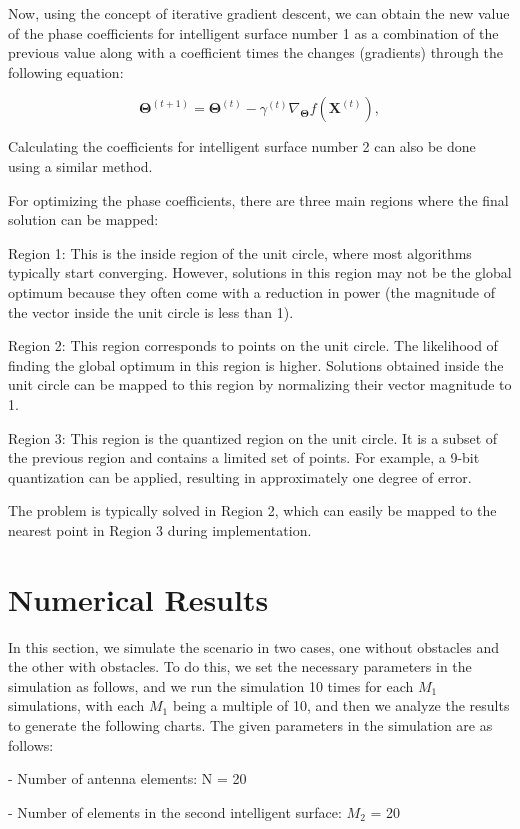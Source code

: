 \documentclass{article}
\begin{document}
Now, using the concept of iterative gradient descent, we can obtain the new value of the phase coefficients for intelligent surface number 1 as a combination of the previous value along with a coefficient times the changes (gradients) through the following equation:

\[
\boldsymbol{\Theta}^{(t+1)}=\boldsymbol{\Theta}^{(t)}-\gamma^{(t)} \nabla_{\boldsymbol{\Theta}} f\left(\mathbf{X}^{(t)}\right),
\]

Calculating the coefficients for intelligent surface number 2 can also be done using a similar method.

For optimizing the phase coefficients, there are three main regions where the final solution can be mapped:

Region 1: This is the inside region of the unit circle, where most algorithms typically start converging. However, solutions in this region may not be the global optimum because they often come with a reduction in power (the magnitude of the vector inside the unit circle is less than 1).

Region 2: This region corresponds to points on the unit circle. The likelihood of finding the global optimum in this region is higher. Solutions obtained inside the unit circle can be mapped to this region by normalizing their vector magnitude to 1.

Region 3: This region is the quantized region on the unit circle. It is a subset of the previous region and contains a limited set of points. For example, a 9-bit quantization can be applied, resulting in approximately one degree of error.

The problem is typically solved in Region 2, which can easily be mapped to the nearest point in Region 3 during implementation.

\section{Numerical Results}
In this section, we simulate the scenario in two cases, one without obstacles and the other with obstacles. To do this, we set the necessary parameters in the simulation as follows, and we run the simulation 10 times for each $M_1$ simulations, with each $M_1$ being a multiple of 10, and then we analyze the results to generate the following charts. The given parameters in the simulation are as follows:

- Number of antenna elements: N = 20

- Number of elements in the second intelligent surface: $M_2$ = 20
\end{document}

